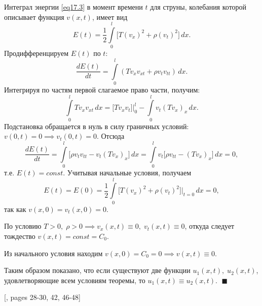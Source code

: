 Интеграл энергии \eqref{eq17.3} в момент времени $t$ для струны, колебания которой описывает функция $v(x,t)$, имеет вид
$$
 E(t) = \frac{1}{2}\int\limits_0^l \big[T (v_x)^2  + \rho (v_t)^2\big]\, dx. 
$$
Продифференцируем $E(t)$ по $t$:
$$
\frac{d E(t)}{dt} = \int\limits_0^l (T v_x v_{xt} + \rho v_t v_{tt}) \, dx.
$$
Интегрируя по частям первой слагаемое право части, получим:
$$
\int\limits_0^l T v_x v_{xt} \, dx = \big[ T v_x v_t\big]\bigg|_0^l - \int\limits_0^l v_t (T v_x)_x \, dx.
$$
Подстановка обращается в нуль в силу граничных условий: $v(0, t) = 0 \implies v_t(0,t) = 0$. Отсюда 
$$
\frac{d E(t)}{dt} = \int\limits_0^l \big[\rho v_t v_{tt} - v_t (T v_x)_x \big]\,dx = \int\limits_0^l v_t \big[\rho v_{tt} - (T v_x)_x\big]\, dx = 0, 
$$
т.е. $E(t) = const$. Учитывая начальные условия, получаем 
$$
E(t) = E(0) = \frac{1}{2} \int\limits_0^l \big[ T (v_x)^2 + \rho (v_t)^2\big]\bigg|_{t=0}\,dx = 0,
$$
так как $v(x,0) = v_t(x, 0) = 0$. 

По условию $T > 0, \; \rho >0 \implies v_x(x,t) \equiv 0, \; v_t(x,t) \equiv 0$, откуда следует тождество $v(x,t) = const = C_0$. 

Из начального условия находим $v(x, 0) = C_0 = 0 \implies v(x,t) \equiv 0$. 

Таким образом показано, что если существуют две функции $u_1(x,t),\;u_2(x,t)$, удовлетворяющие всем условиям теоремы, то $u_1(x,t) \equiv u_2(x,t)$. $\;\blacksquare$


[\cite{urmati_tikhonov}, pages 28-30, 42, 46-48]